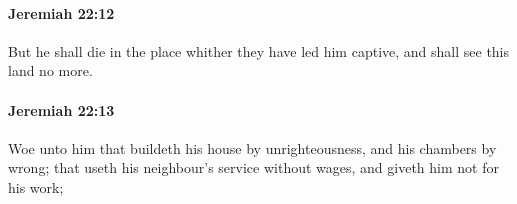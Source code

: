 		\paragraph{Jeremiah 22:12} %
			\label{JEREMIAH-22-12}

			But he shall die in the place whither they have led him captive, and shall see this land no more.


		\paragraph{Jeremiah 22:13} %
			\label{JEREMIAH-22-13}

			Woe unto him that buildeth his house by unrighteousness, and his chambers by wrong; that useth his neighbour’s service without wages, and giveth him not for his work;


